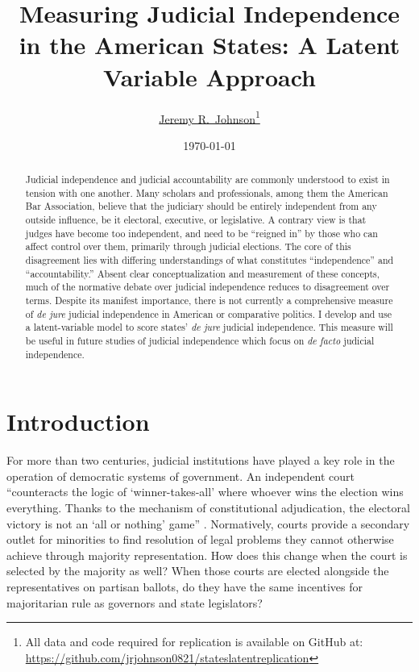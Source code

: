\documentclass[12pt]{article}
\title{Measuring Judicial Independence in the American States: A Latent Variable Approach}
\author{\href{mailto:Jeremy.Johnson@psu.edu}{Jeremy R.\ Johnson}\thanks{All data and code required for replication is available on GitHub at: \url{https://github.com/jrjohnson0821/stateslatentreplication}}}
\affil{Pennsylvania State University}
\date{\today}
\begin{document}
\maketitle
\thispagestyle{empty}
	
\begin{abstract}
Judicial independence and judicial accountability are commonly understood to exist in tension with one another. Many scholars and professionals, among them the American Bar Association, believe that the judiciary should be entirely independent from any outside influence, be it electoral, executive, or legislative. A contrary view is that judges have become too independent, and need to be “reigned in” by those who can affect control over them, primarily through judicial elections. The core of this disagreement lies with differing understandings of what constitutes “independence” and “accountability.” Absent clear conceptualization and measurement of these concepts, much of the normative debate over judicial independence reduces to disagreement over terms. Despite its manifest importance, there is not currently a comprehensive measure of \textit{de jure} judicial independence in American or comparative politics. I develop and use a latent-variable model to score states' \textit{de jure} judicial independence. This measure will be useful in future studies of judicial independence which focus on \textit{de facto} judicial independence.
\end{abstract}
	
	
\pagebreak\doublespacing
\setcounter{page}{1}

\section*{Introduction}\label{Intro}
For more than two centuries, judicial institutions have played a key role in the operation of democratic systems of government.  An independent court ``counteracts the logic of `winner-takes-all' where whoever wins the election wins everything. Thanks to the mechanism of constitutional adjudication, the electoral victory is not an `all or nothing' game'' \citep[1685]{Ferejohn2003}. Normatively, courts provide a secondary outlet for minorities to find resolution of legal problems they cannot otherwise achieve through majority representation.  How does this change when the court is selected by the majority as well?  When those courts are elected alongside the representatives on partisan ballots, do they have the same incentives for majoritarian rule as governors and state legislators?
\end{document}
